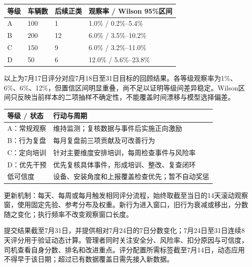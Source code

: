 \documentclass[UTF8,10pt]{ctexart}
\newcommand{\hdr}[1]{\par\vspace{0.4em}{\large\heiti\color{heading}#1}\par\vspace{0.4em}}
\newcommand{\secpage}[1]{\clearpage\hdr{#1}}
\newcommand{\thead}[1]{\textbf{\color{heading}#1}}
\begin{document}
\begin{center}\small
{}
\begin{tabularx}{\textwidth}{p{2.2cm} p{2.2cm} p{2.4cm} Y}
\thead{等级} & \thead{车辆数} & \thead{后续正类} & \thead{观察率 / Wilson 95\%区间} \\
\hline
A & 100 & 1 & 1.0\% / 0.2\%--5.4\% \\
\hline
B & 200 & 12 & 6.0\% / 3.5\%--10.2\% \\
\hline
C & 150 & 9 & 6.0\% / 3.2\%--11.0\% \\
\hline
D & 50 & 6 & 12.0\% / 5.6\%--23.8\% \\
\hline
\end{tabularx}
\end{center}

以上为7月17日评分对应7月18日至31日目标的回顾结果。各等级观察率为1\%、6\%、6\%、12\%，但置信区间明显重叠，尚不足以证明等级间差异稳定。Wilson区间只反映当前样本的二项抽样不确定性，不能覆盖时间漂移与模型选择偏差。

\begin{center}\small
{}
\begin{tabularx}{\textwidth}{p{3.2cm} Y}
\thead{等级 / 状态} & \thead{行动与周期} \\
\hline
A：常规观察 & 维持监测；复核数据与事件后实施正向激励 \\
\hline
B：行为复盘 & 每月复盘前三项贡献及可改善行为 \\
\hline
C：定向培训 & 针对主要维度安排培训，每周检查事件与风险率 \\
\hline
D：优先干预 & 优先复核具体事件，形成培训、整改、复查闭环 \\
\hline
低可信度 & 设备、安装角度和上报覆盖检查优先；暂不自动奖惩 \\
\hline
\end{tabularx}
\end{center}

更新机制：每天、每周或每月触发相同评分流程，始终取截至当日的14天滚动观察窗，使用固定先验、参考分布及权重。新行为进入窗口，旧行为衰减或移出，分数随之变化；执行频率不改变观察窗口长度。

提交结果截至7月31日，并提供相对7月24日的7日分数变化；7月24日至31日连续8天评分用于验证动态计算。管理者同时关注安全分、风险率、扣分原因与可信度，司机查看自身分数、排名和改进重点。评分配置所需标签截至7月14日，动态应用不得早于该日期；超过已有数据覆盖日需先接入新数据。

\secpage{07\;|\;运行复现与提交文件}
\end{document}
